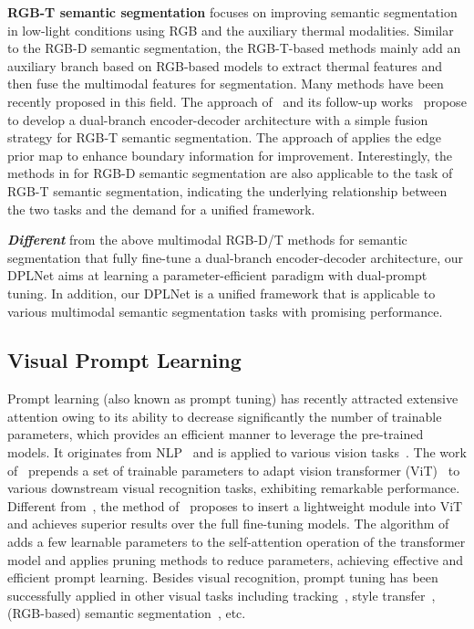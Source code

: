\documentclass[10pt,twocolumn,letterpaper]{article}
\begin{document}
\vspace{0.3em}
\noindent
\textbf{RGB-T semantic segmentation} focuses on improving semantic segmentation in low-light conditions using RGB and the auxiliary thermal modalities. Similar to the RGB-D semantic segmentation, the RGB-T-based methods mainly add an auxiliary branch based on RGB-based models to extract thermal features and then fuse the multimodal features for segmentation. Many methods \cite{mfnet, RTFNet, abmdrnet, EGFNet, GMNet, EGFNetTits, MTANet, EAEFNet, CMX, CMNext} have been recently proposed in this field. The approach of~\cite{RTFNet} and its follow-up works~\cite{EAEFNet, EGFNetTits, abmdrnet} propose to develop a dual-branch encoder-decoder architecture with a simple fusion strategy for RGB-T semantic segmentation. The approach of \cite{EGFNet} applies the edge prior map to enhance boundary information for improvement. Interestingly, the methods in \cite{CMX,CMNext} for RGB-D semantic segmentation are also applicable to the task of RGB-T semantic segmentation, indicating the underlying relationship between the two tasks and the demand for a unified framework.


\textbf{\emph{Different}} from the above multimodal RGB-D/T methods for semantic segmentation that fully fine-tune a dual-branch encoder-decoder architecture, our DPLNet aims at learning a parameter-efficient paradigm with dual-prompt tuning. In addition, our DPLNet is a unified framework that is applicable to various multimodal semantic segmentation tasks with promising performance. 


\subsection{Visual Prompt Learning}

Prompt learning (also known as prompt tuning) has recently attracted extensive attention owing to its ability to decrease significantly the number of trainable parameters, which provides an efficient manner to leverage the pre-trained models. It originates from NLP~\cite{li2021prefix,powerprompt} and is applied to various vision tasks~\cite{VPT,vipt, adaptformer,e2vpt, promptsegmentation,yang2022prompting}. The work of~\cite{VPT} prepends a set of trainable parameters to adapt vision transformer (ViT)~\cite{dosovitskiy2020image} to various downstream visual recognition tasks, exhibiting remarkable performance. Different from~\cite{VPT}, the method of~\cite{adaptformer} proposes to insert a lightweight module into ViT and achieves superior results over the full fine-tuning models. The algorithm of~\cite{e2vpt} adds a few learnable parameters to the self-attention operation of the transformer model and applies pruning methods to reduce parameters, achieving effective and efficient prompt learning. Besides visual recognition, prompt tuning has been successfully applied in other visual tasks including tracking~\cite{vipt,yang2022prompting}, style transfer~\cite{sohn2023visual}, (RGB-based) semantic segmentation~\cite{promptsegmentation}, etc.
\end{document}
